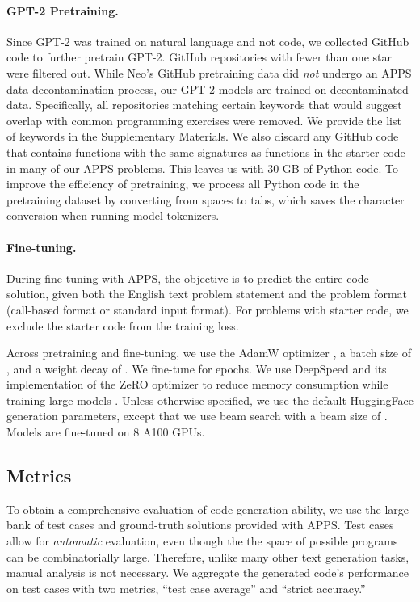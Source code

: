 \documentclass{article}
\begin{document}
\paragraph{GPT-2 Pretraining.}
Since GPT-2 was trained on natural language and not code, we collected GitHub code to further pretrain GPT-2. GitHub repositories with fewer than one star were filtered out.
While Neo's GitHub pretraining data did \emph{not} undergo an APPS data decontamination process, our GPT-2 models are trained on decontaminated data.
Specifically, all repositories matching certain keywords that would suggest overlap with common programming exercises were removed. We provide the list of keywords in the Supplementary Materials. We also discard any GitHub code that contains functions with the same signatures as functions in the starter code in many of our APPS problems. This leaves us with 30 GB of Python code. To improve the efficiency of pretraining, we process all Python code in the pretraining dataset by converting from spaces to tabs, which saves the character conversion when running model tokenizers.



\paragraph{Fine-tuning.}
During fine-tuning with APPS, the objective is to predict the entire code solution, given both the English text problem statement and the problem format (call-based format or standard input format). For problems with starter code, we exclude the starter code from the training loss.


Across pretraining and fine-tuning, we use the AdamW optimizer \citep{Loshchilov2019DecoupledWD}, a batch size of , and a weight decay of . We fine-tune for  epochs. We use DeepSpeed and its implementation of the ZeRO optimizer to reduce memory consumption while training large models \citep{Rasley2020DeepSpeedSO, rajbhandari2020zero}. Unless otherwise specified, we use the default HuggingFace generation parameters, except that we use beam search with a beam size of . Models are fine-tuned on 8 A100 GPUs.


\subsection{Metrics}
To obtain a comprehensive evaluation of code generation ability, we use the large bank of test cases and ground-truth solutions provided with APPS. Test cases allow for \emph{automatic} evaluation, even though the the space of possible programs can be combinatorially large. Therefore, unlike many other text generation tasks, manual analysis is not necessary. We aggregate the generated code's performance on test cases with two metrics, ``test case average'' and ``strict accuracy.'' 
\end{document}

